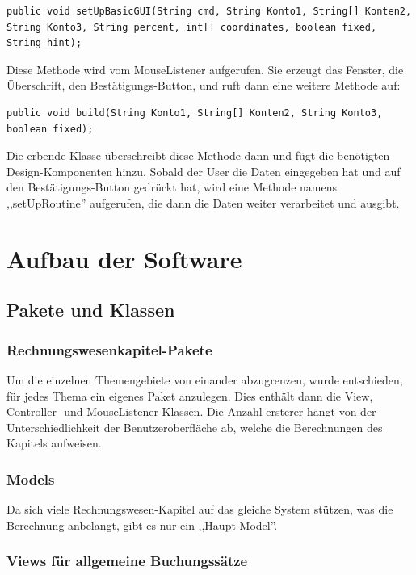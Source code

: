 \documentclass[12pt]{report}
\begin{document}
\lstset{language=Java, breaklines=true}
\begin{lstlisting}
public void setUpBasicGUI(String cmd, String Konto1, String[] Konten2, String Konto3, String percent, int[] coordinates, boolean fixed, String hint);
\end{lstlisting}
Diese Methode wird vom MouseListener aufgerufen. Sie erzeugt das Fenster, die Überschrift, den Bestätigungs-Button, und ruft dann eine weitere Methode auf:
\begin{lstlisting}
public void build(String Konto1, String[] Konten2, String Konto3, boolean fixed);
\end{lstlisting}
Die erbende Klasse überschreibt diese Methode dann und fügt die benötigten Design-Komponenten hinzu. Sobald der User die Daten eingegeben hat und auf den Bestätigungs-Button gedrückt hat, wird eine Methode namens ,,setUpRoutine'' aufgerufen, die dann die Daten weiter verarbeitet und ausgibt.


\chapter{Aufbau der Software}

\section{Pakete und Klassen} 
  
  

\subsection{Rechnungswesenkapitel-Pakete}
Um die einzelnen Themengebiete von einander abzugrenzen, wurde entschieden, für jedes Thema ein eigenes Paket anzulegen. Dies enthält dann die View, Controller -und MouseListener-Klassen. Die Anzahl ersterer hängt von der Unterschiedlichkeit der Benutzeroberfläche ab, welche die Berechnungen des Kapitels aufweisen.

\subsection{Models}
Da sich viele Rechnungswesen-Kapitel auf das gleiche System stützen, was die Berechnung anbelangt, gibt es nur ein ,,Haupt-Model''.
  

  
\subsection{Views für allgemeine Buchungssätze}
\end{document}

